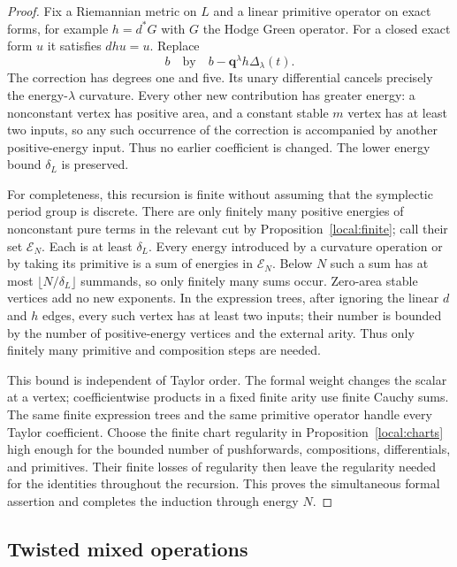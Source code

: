 \documentclass[11pt]{article}
\theoremstyle{definition}
\theoremstyle{remark}
\numberwithin{equation}{section}
\begin{document}
\begin{proof}
Fix a Riemannian metric on $L$ and a linear primitive
operator on exact forms, for example $h=d^*G$ with $G$ the
Hodge Green operator.  For a closed exact form $u$ it
satisfies $dhu=u$.  Replace
\[
 b\quad\text{by}\quad b-\mathbf q^\lambda h\Delta_\lambda(t).
\]
The correction has degrees one and five.  Its unary
differential cancels precisely the energy-$\lambda$
curvature.  Every other new contribution has greater
energy: a nonconstant vertex has positive area, and a
constant stable $m$ vertex has at least two inputs, so any
such occurrence of the correction is accompanied by
another positive-energy input.  Thus no earlier coefficient
is changed.  The lower energy bound $\delta_L$ is preserved.

For completeness, this recursion is finite without assuming
that the symplectic period group is discrete.  There are
only finitely many positive energies of nonconstant pure
terms in the relevant cut by Proposition~\ref{local:finite};
call their set $\mathcal E_N$.  Each is at least
$\delta_L$.  Every energy introduced by a curvature
operation or by taking its primitive is a sum of energies
in $\mathcal E_N$.  Below $N$ such a sum has at most
$\lfloor N/\delta_L\rfloor$ summands, so only finitely many
sums occur.  Zero-area stable vertices add no new
exponents.  In the expression trees, after ignoring the
linear $d$ and $h$ edges, every such vertex has at least two
inputs; their number is bounded by the number of
positive-energy vertices and the external arity.  Thus
only finitely many primitive and composition steps are
needed.

This bound is independent of Taylor order.  The formal
weight changes the scalar at a vertex; coefficientwise
products in a fixed finite arity use finite Cauchy sums.
The same finite expression trees and the same primitive
operator handle every Taylor coefficient.  Choose the
finite chart regularity in Proposition~\ref{local:charts}
high enough for the bounded number of pushforwards,
compositions, differentials, and primitives.  Their finite
losses of regularity then leave the regularity needed for
the identities throughout the recursion.  This proves the
simultaneous formal assertion and completes the induction
through energy $N$.
\end{proof}

\subsection{Twisted mixed operations}
\end{document}
